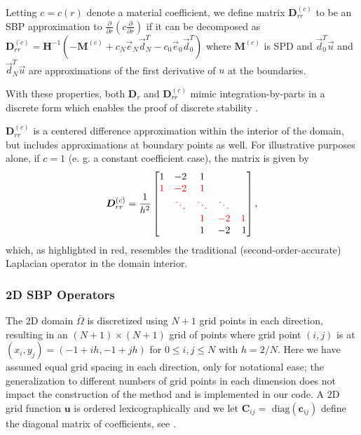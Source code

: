 \begin{definition}
  Letting $c = c(r)$ denote a material coefficient, we define matrix $\boldsymbol{D}^{(c)}_{rr}$ to be an SBP approximation to
  $\frac{\partial }{\partial r}\left(c \frac{\partial}{\partial r}\right)$ if it
  can be decomposed as $\boldsymbol{D}^{(c)}_{rr} =\boldsymbol{H}^{-1}(-\boldsymbol{M}^{(c)} +
  c_N\vec{e}_{N}\vec{d}_{N}^{T} -c_0\vec{e}_{0}\vec{d}_{0}^{T})$ where
  $\boldsymbol{M}^{(c)}$ is SPD and $\vec{d}_{0}^{T}\vec{u}$ and
  $\vec{d}_{N}^{T}\vec{u}$ are approximations of the first derivative of $u$ at
  the boundaries.
\end{definition}
%



With these properties, both $\boldsymbol{D}_{r}$ and $\boldsymbol{D}^{(c)}_{rr}$ mimic integration-by-parts in a discrete form which enables the proof of discrete stability \cite{MN04, Mattsson2009}. 


$\boldsymbol{D}^{(c)}_{rr}$ is a centered difference approximation within the interior of the domain, but includes approximations at boundary points as well. For illustrative purposes alone, if $c = 1$ (e. g. a constant coefficient case), the matrix is given by 
\[
    \boldsymbol{D}^{(c)}_{rr} = \frac{1}{h^2}\begin{bmatrix}
    1 & -2 & 1\\
    {\color{red}1} & {\color{red}-2} & {\color{red}1}\\
    & {\color{red}\ddots} &{\color{red}\ddots} & {\color{red}\ddots}\\
    & & {\color{red}1} &{\color{red}-2} &{\color{red} 1}\\
    & & 1 &-2& \,1 
    \end{bmatrix},
\]
which, as highlighted in red, resembles the traditional (second-order-accurate) Laplacian operator in the domain interior. 




\subsubsection{2D SBP Operators}\label{2d_sbp}
The 2D domain $\bar\Omega$ is discretized using $N+1$ grid points in each direction, resulting in an  $(N+1) \times (N+1)$
grid of points where grid point $(i,j)$ is at $(x_i, y_j) = (-1 + ih, -1 + jh)$ for $0
\leq i, j \leq N$ with $h = 2/N$. Here we have assumed equal grid spacing in each direction, only for notational ease; the generalization to different
numbers of grid points in each dimension does not
impact the construction of the method and is implemented in our code. A 2D grid function $\boldsymbol{u}$ is ordered lexicographically and we let $\boldsymbol{C}_{ij} = \text{ diag}(\boldsymbol{c}_{ij})$ define the diagonal matrix of coefficients, see \cite{Kozdon2020HybridizedSF}.


